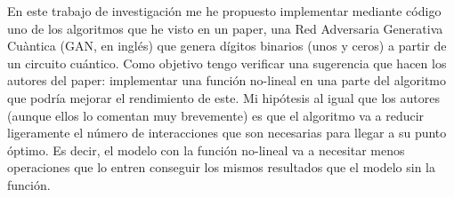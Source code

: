 En este trabajo de investigación me he propuesto implementar mediante código uno de los algoritmos que he visto en un paper, una Red Adversaria Generativa Cuàntica (GAN, en inglés) que genera dígitos binarios (unos y ceros) a partir de un circuito cuántico. Como objetivo tengo verificar una sugerencia que hacen los autores del paper: implementar una función no-lineal en una parte del algoritmo que podría mejorar el rendimiento de este. Mi hipótesis al igual que los autores (aunque ellos lo comentan muy brevemente) es que el algoritmo va a reducir ligeramente el número de interacciones que son necesarias para llegar a su punto óptimo. Es decir, el modelo con la función no-lineal va a necesitar menos operaciones que lo entren conseguir los mismos resultados que el modelo sin la función.




